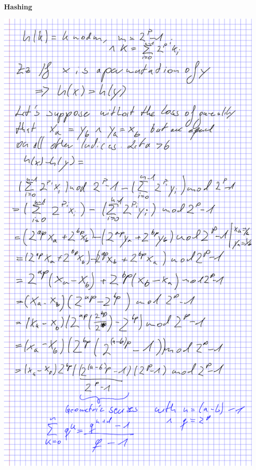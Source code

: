 \question \textbf{Hashing}

\begin{solution}
    \includegraphics[width=0.8\linewidth]{task_2/07_02.pdf}
\end{solution}
